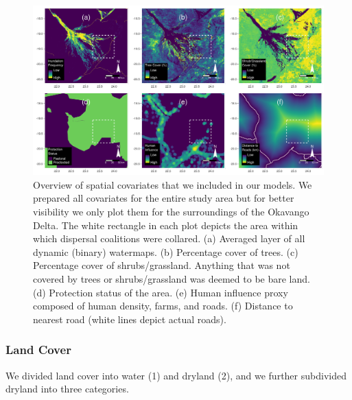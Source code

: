 \documentclass[abstract=on,10pt,a4paper,bibliography=totocnumbered]{article}
\begin{document}
\begin{figure}[h]
  \begin{center}
    \includegraphics[width = \textwidth]{99_Covariates.pdf}
    \caption{Overview of spatial covariates that we included in our models. We
    prepared all covariates for the entire study area but for better visibility
    we only plot them for the surroundings of the Okavango Delta. The white
    rectangle in each plot depicts the area within which dispersal coalitions
    were collared. (a) Averaged layer of all dynamic (binary) watermaps. (b)
    Percentage cover of trees. (c) Percentage cover of shrubs/grassland.
    Anything that was not covered by trees or shrubs/grassland was deemed to be
    bare land. (d) Protection status of the area. (e) Human influence proxy
    composed of human density, farms, and roads. (f) Distance to nearest road
    (white lines depict actual roads).}
    \label{Covariates}
  \end{center}
\end{figure}

\subsubsection{Land Cover}
We divided land cover into water (1) and dryland (2), and we further subdivided
dryland into three categories.
\end{document}
